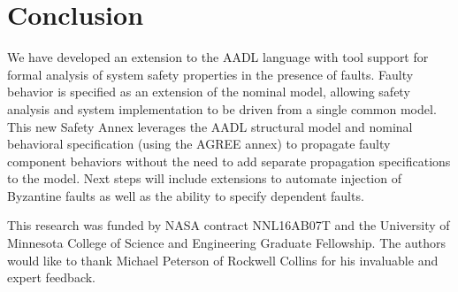 \section{Conclusion}

We have developed an extension to the AADL language with tool support for formal analysis of system safety properties in the presence of faults. Faulty behavior is specified as an extension of the nominal model, allowing safety analysis and system implementation to be driven from a single common model. This new Safety Annex leverages the AADL structural model and nominal behavioral specification (using the AGREE annex) to propagate faulty component behaviors without the need to add separate propagation specifications to the model.   Next steps will include extensions to automate injection of Byzantine faults as well as the ability to specify dependent faults.  

\vspace{2 mm}
 This research was funded by NASA contract NNL16AB07T and the University of Minnesota College of Science and Engineering Graduate Fellowship. The authors would like to thank Michael Peterson of Rockwell Collins for his invaluable and expert feedback. 


